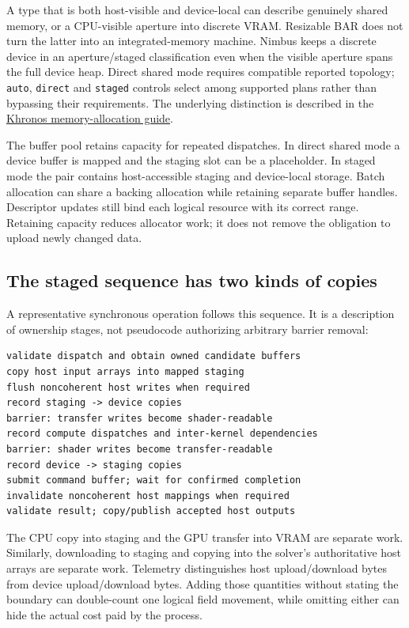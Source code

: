 A type that is both host-visible and device-local can describe genuinely
shared memory, or a CPU-visible aperture into discrete VRAM. Resizable BAR
does not turn the latter into an integrated-memory machine. Nimbus keeps a
discrete device in an aperture/staged classification even when the visible
aperture spans the full device heap. Direct shared mode requires compatible
reported topology; \texttt{auto}, \texttt{direct} and \texttt{staged} controls
select among supported plans rather than bypassing their requirements.
The underlying distinction is described in the
\href{https://docs.vulkan.org/guide/latest/memory_allocation.html}{Khronos
memory-allocation guide}.

The buffer pool retains capacity for repeated dispatches. In direct shared
mode a device buffer is mapped and the staging slot can be a placeholder.
In staged mode the pair contains host-accessible staging and device-local
storage. Batch allocation can share a backing allocation while retaining
separate buffer handles. Descriptor updates still bind each logical resource
with its correct range. Retaining capacity reduces allocator work; it does
not remove the obligation to upload newly changed data.

\subsection{The staged sequence has two kinds of copies}

A representative synchronous operation follows this sequence. It is a
description of ownership stages, not pseudocode authorizing arbitrary
barrier removal:

\begin{verbatim}
validate dispatch and obtain owned candidate buffers
copy host input arrays into mapped staging
flush noncoherent host writes when required
record staging -> device copies
barrier: transfer writes become shader-readable
record compute dispatches and inter-kernel dependencies
barrier: shader writes become transfer-readable
record device -> staging copies
submit command buffer; wait for confirmed completion
invalidate noncoherent host mappings when required
validate result; copy/publish accepted host outputs
\end{verbatim}

The CPU copy into staging and the GPU transfer into VRAM are separate work.
Similarly, downloading to staging and copying into the solver's authoritative
host arrays are separate work. Telemetry distinguishes host upload/download
bytes from device upload/download bytes. Adding those quantities without
stating the boundary can double-count one logical field movement, while
omitting either can hide the actual cost paid by the process.

